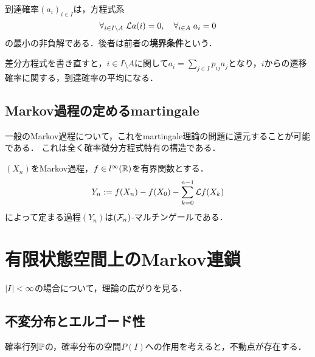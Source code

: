 \documentclass[uplatex,dvipdfmx]{jsreport}
\begin{document}
\begin{theorem}[到達確率の特徴付け]
    到達確率$(a_i)_{i\in I}$は，方程式系
    \[\forall_{i\in I\setminus A}\;\mathcal{L} a(i)=0,\quad\forall_{i\in A}\;a_i=0\]
    の最小の非負解である．後者は前者の\textbf{境界条件}という．
\end{theorem}
\begin{remarks}
    差分方程式を書き直すと，$i\in I\setminus A$に関して$a_i=\sum_{j\in I}p_{ij}a_j$となり，$i$からの遷移確率に関する，到達確率の平均になる．
\end{remarks}

\subsection{Markov過程の定めるmartingale}

\begin{tcolorbox}[colframe=ForestGreen, colback=ForestGreen!10!white,breakable,colbacktitle=ForestGreen!40!white,coltitle=black,fonttitle=\bfseries\sffamily,
title=]
    一般のMarkov過程について，これをmartingale理論の問題に還元することが可能である．
    これは全く確率微分方程式特有の構造である．
\end{tcolorbox}

\begin{theorem}
    $(X_n)$をMarkov過程，$f\in l^\infty(\mathbb{R})$を有界関数とする．
    \[Y_n:=f(X_n)-f(X_0)-\sum_{k=0}^{n-1}\mathcal{L} f(X_k)\]
    によって定まる過程$(Y_n)$は$(\mathcal{F}_n)$-マルチンゲールである．
\end{theorem}

\section{有限状態空間上のMarkov連鎖}

\begin{tcolorbox}[colframe=ForestGreen, colback=ForestGreen!10!white,breakable,colbacktitle=ForestGreen!40!white,coltitle=black,fonttitle=\bfseries\sffamily,
title=]
    $\lvert I\rvert<\infty$の場合について，理論の広がりを見る．
\end{tcolorbox}

\subsection{不変分布とエルゴード性}

\begin{tcolorbox}[colframe=ForestGreen, colback=ForestGreen!10!white,breakable,colbacktitle=ForestGreen!40!white,coltitle=black,fonttitle=\bfseries\sffamily,
title=]
    確率行列$\mathbb{P}$の，確率分布の空間$P(I)$への作用を考えると，不動点が存在する．
\end{tcolorbox}
\end{document}

